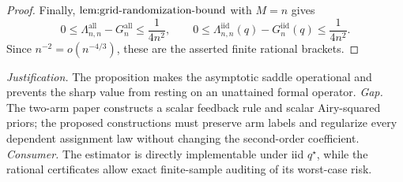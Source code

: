 \documentclass{article}
\begin{document}
\begin{proof}
Finally, \(\textnormal{lem:grid-randomization-bound}\) with \(M=n\) gives
\[
0\leq\Lambda_{n,n}^{\mathrm{all}}-G_n^{\mathrm{all}}\leq\frac1{4n^2},
\qquad
0\leq\Lambda_{n,n}^{\mathrm{iid}}(q)-G_n^{\mathrm{iid}}(q)\leq\frac1{4n^2}.
\]
Since \(n^{-2}=o(n^{-4/3})\), these are the asserted finite rational brackets.
\end{proof}
\par\smallskip\noindent \textit{Justification.} The proposition makes the asymptotic saddle operational and prevents the sharp value from resting on an unattained formal operator. \textit{Gap.} The two-arm paper constructs a scalar feedback rule and scalar Airy-squared priors; the proposed constructions must preserve arm labels and regularize every dependent assignment law without changing the second-order coefficient. \textit{Consumer.} The estimator is directly implementable under iid \(q^\star\), while the rational certificates allow exact finite-sample auditing of its worst-case risk.
\end{document}
